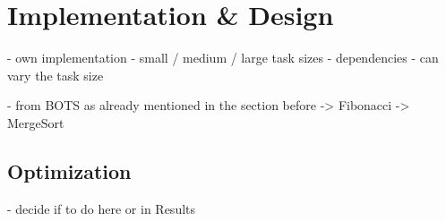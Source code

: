\section{Implementation \& Design}
- own implementation
  - small / medium / large task sizes
  - dependencies
  - can vary the task size
  
- from BOTS
	as already mentioned in the section before
	-> Fibonacci
	-> MergeSort
		
		
\subsection{Optimization}
	- decide if to do here or in Results